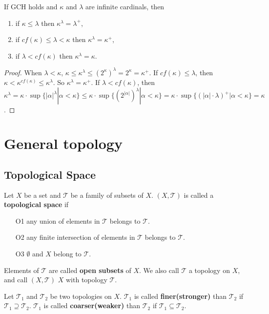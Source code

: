 \documentclass[12pt]{book}
\begin{document}
\begin{theorem}
	If GCH holds and $\kappa$ and $\lambda$ are infinite cardinals, then
	\begin{enumerate}
		\item if $\kappa\leq\lambda$ then $\kappa^\lambda=\lambda^+$,
		\item if $cf(\kappa)\leq\lambda<\kappa$ then $\kappa^\lambda=\kappa^+$,
		\item if $\lambda<cf(\kappa)$ then $\kappa^\lambda=\kappa$.
	\end{enumerate}
\end{theorem}
\begin{proof}
	When $\lambda<\kappa$, $\kappa\leq \kappa^\lambda\leq (2^\kappa)^\lambda=2^\kappa=\kappa^+$. If $cf(\kappa)\leq\lambda$, then $\kappa<\kappa^{cf(\kappa)}\leq \kappa^\lambda$. So $\kappa^\lambda=\kappa^+$. If $\lambda<cf(\kappa)$, then $\kappa^\lambda=\kappa\cdot\sup\{|\alpha|^\lambda|\alpha<\kappa\}\leq\kappa\cdot\sup\{(2^{|\alpha|})^\lambda|\alpha<\kappa\}=\kappa\cdot\sup\{(|\alpha|\cdot\lambda)^+|\alpha<\kappa\}=\kappa$.
\end{proof}
\part{General topology}
\chapter{Topological Space}
	
\begin{definition}
	Let $X$ be a set and $\mathcal T$ be a family of subsets of $X$. $(X,\mathcal T)$ is called a {\bf topological space} if
	\begin{enumerate}
		\item[O1] any union of elements in $\mathcal T$ belongs to $\mathcal T$.
		\item[O2] any finite intersection of elements in $\mathcal T$ belongs to $\mathcal T$.
		\item[O3] $\emptyset$ and $X$ belong to $\mathcal T$.
	\end{enumerate}
	
	Elements of $\mathcal T$ are called {\bf open subsets} of $X$. We also call $\mathcal T$ a topology on $X$, and call $(X,\mathcal T)$ $X$ with topology $\mathcal T$.
\end{definition}

\begin{definition}
	Let $\mathcal T_1$ and $\mathcal T_2$ be two topologies on $X$. $\mathcal T_1$ is called {\bf finer(stronger)} than $\mathcal T_2$ if $\mathcal T_1\supseteq \mathcal T_2$. $\mathcal T_1$ is called {\bf coarser(weaker)} than $\mathcal T_2$ if $\mathcal T_1\subseteq \mathcal T_2$.
\end{definition}
\end{document}
